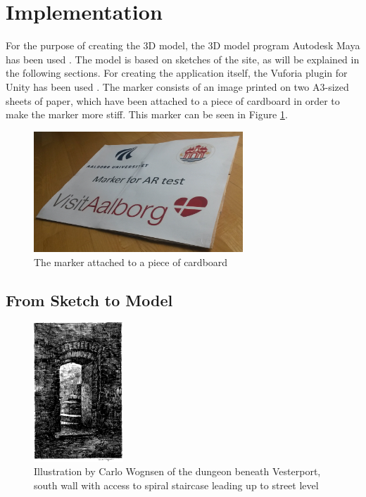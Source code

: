 \section{Implementation}
For the purpose of creating the 3D model, the 3D model program Autodesk Maya has been used \cite{Maya}. The model is based on sketches of the site, as will be explained in the following sections. For creating the application itself, the Vuforia plugin for Unity has been used \cite{Vuforia} \cite{Unity}. The marker consists of an image printed on two A3-sized sheets of paper, which have been attached to a piece of cardboard in order to make the marker more stiff. This marker can be seen in Figure \ref{fig:marker_photo}.

\begin{figure}[h!]
    \centering
    \includegraphics[width=0.7\textwidth]{figures/marker_photo.jpg}
	\caption{The marker attached to a piece of cardboard}\label{fig:marker_photo}
\end{figure}
\pagebreak

\subsection{From Sketch to Model}
\begin{figure}
\centering
        \includegraphics[width=0.3\textwidth]{figures/sketch1.png}
        \caption{Illustration by Carlo Wognsen of the dungeon beneath Vesterport, south wall with access to spiral staircase leading up to street level \cite{Riismoller1961}}\label{fig:sketch1}
\end{figure}

